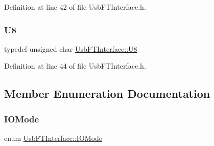 Definition at line 42 of file Usb\+F\+T\+Interface.\+h.

\mbox{\label{classUsbFTInterface_a3b007566f8af758984d97ada2b9938d3}} 
\subsubsection{\texorpdfstring{U8}{U8}}
{\footnotesize\ttfamily typedef unsigned char \hyperlink{classUsbFTInterface_a3b007566f8af758984d97ada2b9938d3}{Usb\+F\+T\+Interface\+::\+U8}}



Definition at line 44 of file Usb\+F\+T\+Interface.\+h.



\subsection{Member Enumeration Documentation}
\mbox{\label{classUsbFTInterface_ace858cb26e5a7e13f69074fae6bf8f4a}} 
\subsubsection{\texorpdfstring{I\+O\+Mode}{IOMode}}
{\footnotesize\ttfamily enum \hyperlink{classUsbFTInterface_ace858cb26e5a7e13f69074fae6bf8f4a}{Usb\+F\+T\+Interface\+::\+I\+O\+Mode}}

